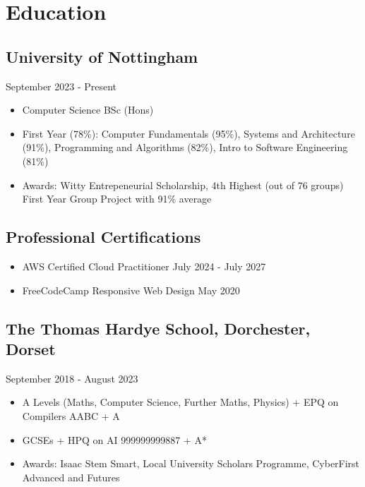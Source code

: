 \section{Education}
\subsection{University of Nottingham}{}{September 2023 - Present}
\begin{itemize}
    \item Computer Science BSc (Hons)
    \item First Year (78\%): \hfill Computer Fundamentals (95\%), Systems and Architecture (91\%), \newline \phantom{.} \hfill Programming and Algorithms (82\%), Intro to Software Engineering (81\%)
    \item Awards: \hfill Witty Entrepeneurial Scholarship, 4th Highest (out of 76 groups) First Year Group Project with 91\% average
\end{itemize}
\vspace{.1em}
\subsection{Professional Certifications}{}{}
\begin{itemize}
  \item AWS Certified Cloud Practitioner \hfill July 2024 - July 2027
  \item FreeCodeCamp Responsive Web Design \hfill May 2020
\end{itemize}
\subsection{The Thomas Hardye School, Dorchester, Dorset}{}{September 2018 - August 2023}
\begin{itemize}
\item A Levels (Maths, Computer Science, Further Maths, Physics) + EPQ on Compilers \hfill AABC + A
\item GCSEs + HPQ on AI \hfill 999999999887 + {A*}
\item Awards: \hfill Isaac Stem Smart, Local University Scholars Programme, CyberFirst Advanced and Futures
\end{itemize}


\vspace{.3em}
